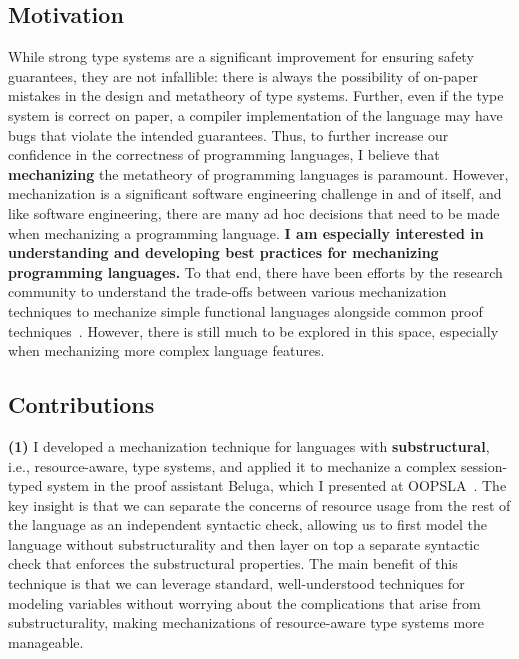\documentclass[11pt]{article}
\begin{document}
\subsection*{Motivation}
While strong type systems are a significant improvement for ensuring safety guarantees, they are not infallible:
there is always the possibility of on-paper mistakes in the design and metatheory of type systems.
Further, even if the type system is correct on paper, a compiler implementation of the language may have bugs that violate the intended guarantees.
Thus, to further increase our confidence in the correctness of programming languages, I believe that \textbf{mechanizing} the metatheory of programming languages is paramount.
However, mechanization is a significant software engineering challenge in and of itself, and like software engineering, there are many ad hoc
decisions that need to be made when mechanizing a programming language.
\textbf{I am especially interested in understanding and developing best practices for mechanizing programming languages.}
To that end, there have been efforts by the research community to understand the trade-offs between various mechanization techniques
to mechanize simple functional languages alongside common proof techniques~\cite{Aydemir05tphols, Abel19jfp}.
However, there is still much to be explored in this space, especially when mechanizing more complex language features.

\subsection*{Contributions}
\hspace{\parindent}\ignorespaces\textbf{(1)} I developed a mechanization technique for languages with \textbf{substructural}, i.e., resource-aware, type systems, and applied it to mechanize a complex session-typed system in the proof assistant Beluga, which I presented at OOPSLA~\cite{Sano23oopsla}.
The key insight is that we can separate the concerns of resource usage from the rest of the language as an independent syntactic check, allowing us to first model the language without substructurality and then layer on top a separate syntactic check that enforces the substructural properties.
The main benefit of this technique is that we can leverage standard,
well-understood techniques for modeling variables without worrying
about the complications that arise from substructurality, making mechanizations of resource-aware type systems more manageable.
\end{document}
